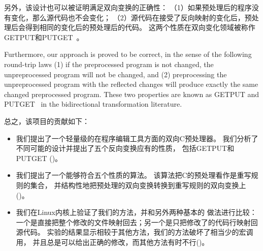 另外，该设计也可以被证明满足双向变换的正确性：
（1）如果预处理后的程序没有变化，那么源代码也不会变化；
（2）源代码在接受了反向映射的变化后，预处理后会得到相同的变化后的预处理后的代码。
这两个性质在双向变化领域被称作GETPUT和PUTGET~\parencite{Foster:2007}。

Furthermore, our approach is proved to be correct, in the
sense of the following round-trip laws (1) if the preprocessed program is not changed, the
unpreprocessed program will not be changed, and (2) preprocessing the
unpreprocessed program with the reflected changes will produce exactly the
same changed preprocessed program. These two properties are known as
GETPUT and PUTGET~\parencite{Foster:2007} in the bidirectional transformation literature. 

总之，该项目的贡献如下：
\begin{itemize}
\item 我们提出了一个轻量级的在程序编辑工具方面的双向C预处理器。
	我们分析了不同可能的设计并提出了五个反向变换应有的性质，
	包括GETPUT和PUTGET
	()。
\item 我们提出了一个能够符合五个性质的算法。
	该算法把C的预处理看作是重写规则的集合，
	并结构性地把预处理的双向变换转换到重写规则的双向变换上
	()。
\item 我们在Linux内核上验证了我们的方法，并和另外两种基本的
	做法进行比较：一个是直接把整个修改的文件映射回去；另一个是只把修改了的代码行映射回源代码。
	实验的结果显示相较于其他方法，我们的方法破坏了相当少的宏调用，
	并且总是可以给出正确的修改，而其他方法有时不行()。
\end{itemize}


